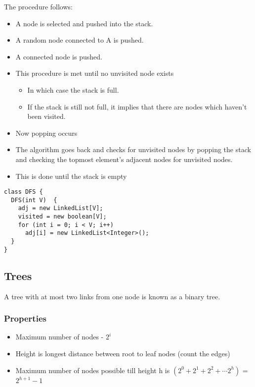 \documentclass[11pt]{article}
\begin{document}
\begin{enumerate}
The procedure follows:
\begin{itemize}
\item A node is selected and pushed into the stack.
\item A random node connected to A is pushed.
\item A connected node is pushed.
\item This procedure is met until no unvisited node exists
\begin{itemize}
\item In which case the stack is full.
\item If the stack is still not full, it implies that there are nodes which haven't been visited.
\end{itemize}
\item Now popping occurs
\item The algorithm goes back and checks for unvisited nodes by popping the stack and checking the topmost element's adjacent nodes for unvisited nodes.
\item This is done until the stack is empty
\end{itemize}

\begin{verbatim}
class DFS {
  DFS(int V)  {
    adj = new LinkedList[V];
    visited = new boolean[V];
    for (int i = 0; i < V; i++)
      adj[i] = new LinkedList<Integer>();
  }
}
\end{verbatim}
\end{enumerate}
\subsection{Trees}
\label{sec:orgfd871ea}
A tree with at most two links from one node is known as a binary tree.
\subsubsection{Properties}
\label{sec:orgc6defa2}
\begin{itemize}
\item Maximum number of nodes - \(2^i\)
\item Height is longest distance between root to leaf nodes (count the edges)
\item Maximum number of nodes possible till height h is \((2^0 + 2^1 + 2^2 + \cdots 2^h)\) = \(2^{h+1} -1\)
\end{itemize}
\end{document}
